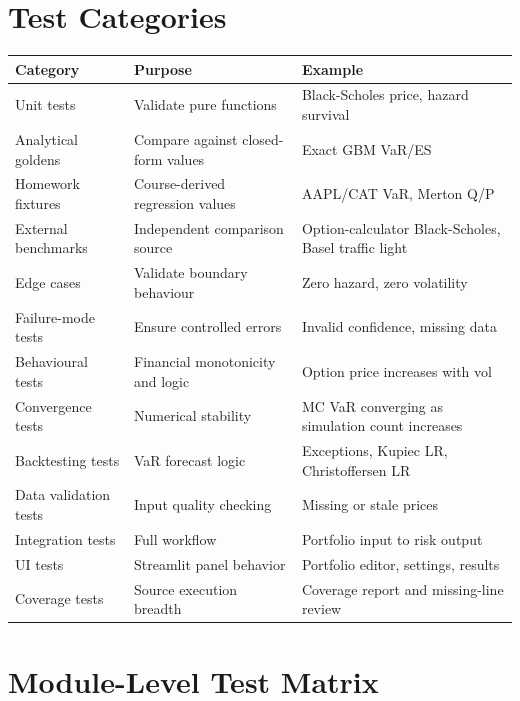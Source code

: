 \documentclass[11pt]{article}
\begin{document}
\section{Test Categories}

\begin{center}
\begin{tabular}{L{3.5cm}L{5cm}L{5cm}}
\toprule
\textbf{Category} & \textbf{Purpose} & \textbf{Example} \\
\midrule
Unit tests              & Validate pure functions & Black-Scholes price, hazard survival \\
Analytical goldens      & Compare against closed-form values & Exact GBM VaR/ES \\
Homework fixtures       & Course-derived regression values & AAPL/CAT VaR, Merton Q/P \\
External benchmarks     & Independent comparison source & Option-calculator Black-Scholes, Basel traffic light \\
Edge cases              & Validate boundary behaviour & Zero hazard, zero volatility \\
Failure-mode tests      & Ensure controlled errors & Invalid confidence, missing data \\
Behavioural tests       & Financial monotonicity and logic & Option price increases with vol \\
Convergence tests       & Numerical stability & MC VaR converging as simulation count increases \\
Backtesting tests       & VaR forecast logic & Exceptions, Kupiec LR, Christoffersen LR \\
Data validation tests   & Input quality checking & Missing or stale prices \\
Integration tests       & Full workflow & Portfolio input to risk output \\
UI tests                & Streamlit panel behavior & Portfolio editor, settings, results \\
Coverage tests          & Source execution breadth & Coverage report and missing-line review \\
\bottomrule
\end{tabular}
\end{center}

\section{Module-Level Test Matrix}
\end{document}
